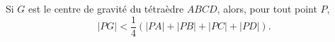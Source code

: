 Si $G$ est le centre de gravité du tétraèdre $ABCD$, alors, pour tout point $P$,
\[ |PG| < \frac{1}{4}\left(|PA| + |PB| + |PC| + |PD|\right). \]

